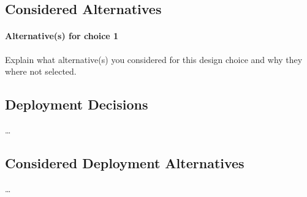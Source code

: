     \subsection*{Considered Alternatives}
        \paragraph{Alternative(s) for choice 1} Explain what alternative(s) you
        considered for this design choice and why they where not selected.

    \subsection*{Deployment Decisions}
        \ldots

    \subsection*{Considered Deployment Alternatives}
        \ldots
